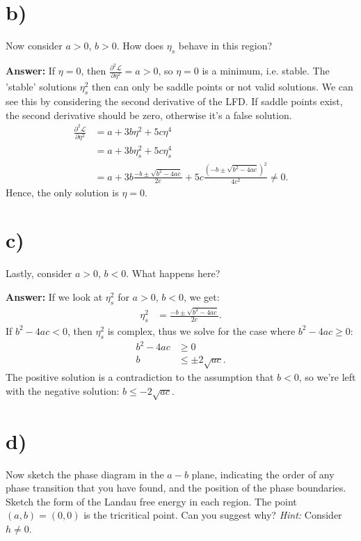\documentclass[a4paper]{article}
\newcommand{\newparagraph}{\vspace{.5cm}\noindent}
\newcommand{\fpartial}[2]{\frac{\partial #1}{\partial #2}}
\begin{document}
\section*{b)}
Now consider $a>0$, $b>0$. How does $\eta_s$ behave in this region?

\newparagraph
\textbf{Answer: }If $\eta = 0$, then $\fpartial{^2\mathcal{L}}{\eta^2} = a > 0$, so $\eta = 0$ is a minimum, i.e. stable.
The 'stable' solutions $\eta_s^2$ then can only be saddle points or not valid solutions. We can see this by considering the second derivative of the LFD. If saddle points exist, the second derivative should be zero, otherwise it's a false solution.
\begin{align*}
    \fpartial{^2\mathcal{L}}{\eta^2} &= a + 3b\eta^2 + 5c\eta^4\\
    &= a + 3b\eta_s^2 + 5c\eta_s^4\\
    &= a + 3b\frac{-b \pm \sqrt{b^2 - 4ac}}{2c} + 5c\frac{\left(-b \pm \sqrt{b^2 - 4ac}\right)^2}{4c^2}\neq 0.
\end{align*}Hence, the only solution is $\eta = 0$.
\section*{c)}
Lastly, consider $a>0$, $b<0$. What happens here?

\newparagraph
\textbf{Answer: }If we look at $\eta_s^2$ for $a>0$, $b<0$, we get:
\begin{align*}
    \eta_s^2 &= \frac{-b \pm \sqrt{b^2 - 4ac}}{2c}.
\end{align*}If $b^2 - 4ac < 0$, then $\eta_s^2$ is complex, thus we solve for the case where $b^2 - 4ac \geq 0$:
\begin{align*}
    b^2 - 4ac &\geq 0\\
    b &\leq \pm 2\sqrt{ac}.
\end{align*}The positive solution is a contradiction to the assumption that $b < 0$, so we're left with the negative solution: $b \leq -2\sqrt{ac}$.


\section*{d)}
Now sketch the phase diagram in the $a-b$ plane, indicating the order of any phase transition that you have found, and the position of the phase boundaries.
Sketch the form of the Landau free energy in each region.
The point $(a,b) = (0,0)$ is the tricritical point.
Can you suggest why? \textit{Hint:} Consider $h \neq 0$.
\end{document}
